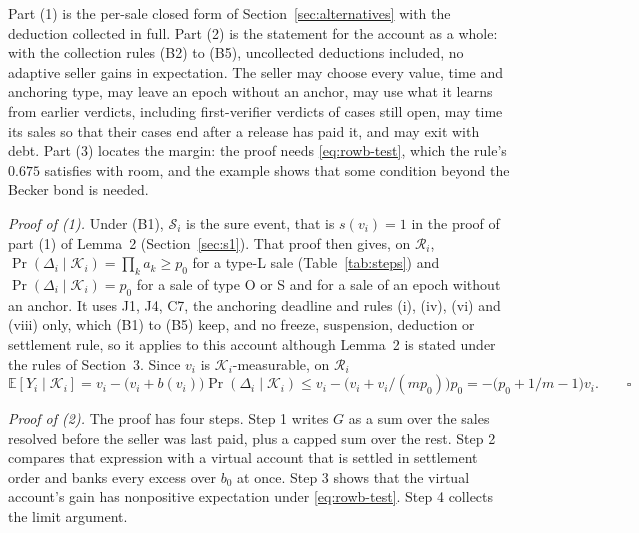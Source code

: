 \documentclass[10pt,a4paper]{article}
\newcommand{\E}{\mathbb{E}}
\newcommand{\cK}{\mathcal{K}}
\newcommand{\cR}{\mathcal{R}}
\newcommand{\cS}{\mathcal{S}}
\theoremstyle{plain}
\theoremstyle{remark}
\begin{document}
Part (1) is the per-sale closed form of Section~\ref{sec:alternatives} with the deduction collected in full. Part (2) is the statement for the account as a whole: with the collection rules (B2) to (B5), uncollected deductions included, no adaptive seller gains in expectation. The seller may choose every value, time and anchoring type, may leave an epoch without an anchor, may use what it learns from earlier verdicts, including first-verifier verdicts of cases still open, may time its sales so that their cases end after a release has paid it, and may exit with debt. Part (3) locates the margin: the proof needs \eqref{eq:rowb-test}, which the rule's $0.675$ satisfies with room, and the example shows that some condition beyond the Becker bond is needed.

\emph{Proof of (1).} Under (B1), $\cS_i$ is the sure event, that is $s(v_i)=1$ in the proof of part (1) of Lemma~2 (Section~\ref{sec:s1}). That proof then gives, on $\cR_i$, $\Pr(\Delta_i\mid\cK_i)=\prod_ka_k\ge p_0$ for a type-L sale (Table~\ref{tab:steps}) and $\Pr(\Delta_i\mid\cK_i)=p_0$ for a sale of type O or S and for a sale of an epoch without an anchor. It uses J1, J4, C7, the anchoring deadline and rules (i), (iv), (vi) and (viii) only, which (B1) to (B5) keep, and no freeze, suspension, deduction or settlement rule, so it applies to this account although Lemma~2 is stated under the rules of Section~3. Since $v_i$ is $\cK_i$-measurable, on $\cR_i$
\[
\E[Y_i\mid\cK_i]=v_i-\big(v_i+b(v_i)\big)\Pr(\Delta_i\mid\cK_i)\le v_i-\big(v_i+v_i/(m p_0)\big)p_0=-\big(p_0+1/m-1\big)v_i .\qquad\square
\]

\emph{Proof of (2).} The proof has four steps. Step 1 writes $G$ as a sum over the sales resolved before the seller was last paid, plus a capped sum over the rest. Step 2 compares that expression with a virtual account that is settled in settlement order and banks every excess over $b_0$ at once. Step 3 shows that the virtual account's gain has nonpositive expectation under \eqref{eq:rowb-test}. Step 4 collects the limit argument.
\end{document}
